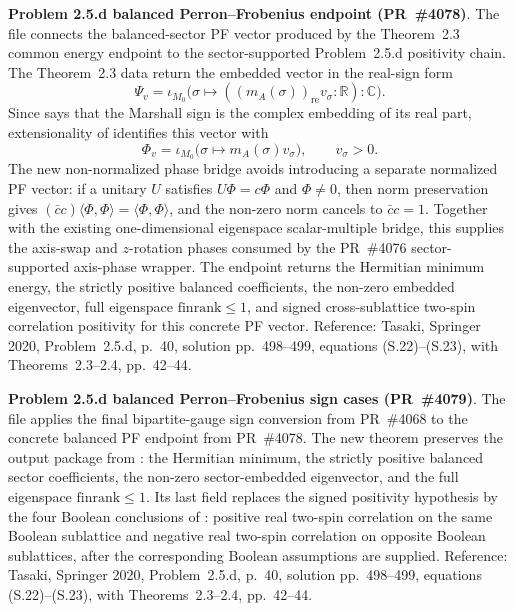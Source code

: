 \documentclass[a4paper,11pt]{article}
\begin{document}
\textbf{Problem 2.5.d balanced Perron--Frobenius endpoint (PR~\#4078)}.
The file 
connects the balanced-sector PF vector produced by the Theorem~2.3 common
energy endpoint to the sector-supported Problem~2.5.d positivity chain.
The Theorem~2.3 data return the embedded vector in the real-sign form
\[
  \Psi_v=\iota_{M_0}\bigl(\sigma\mapsto
    ((m_A(\sigma))_{\mathrm{re}}v_\sigma:\mathbb R):\mathbb C\bigr).
\]
Since  says that the Marshall sign is the
complex embedding of its real part, extensionality of
 identifies this vector with
\[
  \Phi_v=\iota_{M_0}\bigl(\sigma\mapsto m_A(\sigma)v_\sigma\bigr),
  \qquad v_\sigma>0.
\]
The new non-normalized phase bridge
 avoids introducing a
separate normalized PF vector: if a unitary \(U\) satisfies
\(U\Phi=c\Phi\) and \(\Phi\ne0\), then norm preservation gives
\((\bar c c)\langle\Phi,\Phi\rangle=\langle\Phi,\Phi\rangle\), and the
non-zero norm cancels to \(\bar c c=1\).  Together with the existing
one-dimensional eigenspace scalar-multiple bridge, this supplies the
axis-swap and \(z\)-rotation phases consumed by the PR~\#4076
sector-supported axis-phase wrapper.  The endpoint
returns the Hermitian minimum energy, the strictly positive balanced
coefficients, the non-zero embedded eigenvector, full eigenspace
\(\mathrm{finrank}\le1\), and signed cross-sublattice two-spin correlation
positivity for this concrete PF vector.  Reference: Tasaki, Springer 2020,
Problem~2.5.d, p.~40, solution pp.~498--499, equations (S.22)--(S.23), with
Theorems~2.3--2.4, pp.~42--44.

\textbf{Problem 2.5.d balanced Perron--Frobenius sign cases (PR~\#4079)}.
The file  applies the
final bipartite-gauge sign conversion from PR~\#4068 to the concrete balanced
PF endpoint from PR~\#4078.  The new theorem
 preserves
the output package from
:
the Hermitian minimum, the strictly positive balanced sector coefficients, the
non-zero sector-embedded eigenvector, and the full eigenspace
\(\mathrm{finrank}\le1\).  Its last field replaces the signed positivity
hypothesis by the four Boolean conclusions of
: positive
real two-spin correlation on the same Boolean sublattice and negative real
two-spin correlation on opposite Boolean sublattices, after the corresponding
Boolean assumptions are supplied.  Reference: Tasaki, Springer 2020,
Problem~2.5.d, p.~40, solution pp.~498--499, equations (S.22)--(S.23), with
Theorems~2.3--2.4, pp.~42--44.
\end{document}
